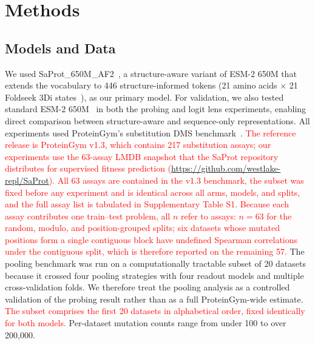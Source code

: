 \documentclass[numbered,webpdf,modern,large]{oup-authoring-template}
\newcommand{\rev}[1]{\textcolor{red}{#1}}
\begin{document}
\section{Methods}

\subsection{Models and Data}

We used SaProt\_650M\_AF2~\cite{su2024saprot}, a structure-aware variant of ESM-2 650M
that extends the vocabulary to 446 structure-informed tokens (21 amino acids $\times$ 21
Foldseek 3Di states~\cite{vankempen2024foldseek}), as our primary model. For validation,
we also tested standard ESM-2 650M~\cite{lin2023evolutionary} in both the probing and
logit lens experiments, enabling direct comparison between structure-aware and
sequence-only representations. All experiments used ProteinGym's substitution DMS
benchmark~\cite{notin2024proteingym}. \rev{The reference release is ProteinGym
v1.3, which contains 217 substitution assays; our experiments use the 63-assay
LMDB snapshot that the SaProt repository distributes for supervised fitness
prediction (\url{https://github.com/westlake-repl/SaProt}). All 63 assays are
contained in the v1.3 benchmark, the subset was fixed before any experiment and
is identical across all arms, models, and splits, and the full assay list is
tabulated in Supplementary Table S1. Because each assay contributes one
train--test problem, all $n$ refer to assays: $n = 63$ for the random, modulo,
and position-grouped splits; six datasets whose mutated positions form a single
contiguous block have undefined Spearman correlations under the contiguous
split, which is therefore reported on the remaining 57.}
The pooling benchmark was run on a computationally tractable subset of
20 datasets because it crossed four pooling strategies with four readout models and
multiple cross-validation folds. We therefore treat the pooling analysis as a
controlled validation of the probing result rather than as a full ProteinGym-wide
estimate. \rev{The subset comprises the first 20 datasets in alphabetical order,
fixed identically for both models.} Per-dataset mutation counts range from under 100 to over 200,000.
\end{document}
